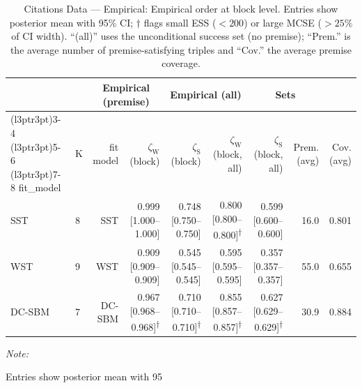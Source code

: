 \begin{table}
\centering
\caption{\label{tab:tab:citations-data-empirical-emp-block}Citations Data — Empirical: Empirical order at block level. Entries show posterior mean with 95\% CI; $\dagger$ flags small ESS ($<200$) or large MCSE ($>25\%$ of CI width). “(all)” uses the unconditional success set (no premise); “Prem.” is the average number of premise-satisfying triples and “Cov.” the average premise coverage.}
\centering
\begin{threeparttable}
\begin{tabular}[t]{llrrrrrrr}
\toprule
\multicolumn{2}{c}{ } & \multicolumn{2}{c}{Empirical (premise)} & \multicolumn{2}{c}{Empirical (all)} & \multicolumn{2}{c}{Sets} \\
\cmidrule(l{3pt}r{3pt}){3-4} \cmidrule(l{3pt}r{3pt}){5-6} \cmidrule(l{3pt}r{3pt}){7-8}
fit_model & K & fit model & $\zeta_{\mathrm{W}}$ (block) & $\zeta_{\mathrm{S}}$ (block) & $\zeta_{\mathrm{W}}$ (block, all) & $\zeta_{\mathrm{S}}$ (block, all) & Prem. (avg) & Cov. (avg)\\
\midrule
SST & 8 & SST & 0.999 [1.000--1.000] & 0.748 [0.750--0.750] & 0.800 [0.800--0.800]\textsuperscript{$\dagger$} & 0.599 [0.600--0.600] & 16.0 & 0.801\\
WST & 9 & WST & 0.909 [0.909--0.909] & 0.545 [0.545--0.545] & 0.595 [0.595--0.595] & 0.357 [0.357--0.357] & 55.0 & 0.655\\
DC-SBM & 7 & DC-SBM & 0.967 [0.968--0.968]\textsuperscript{$\dagger$} & 0.710 [0.710--0.710]\textsuperscript{$\dagger$} & 0.855 [0.857--0.857]\textsuperscript{$\dagger$} & 0.627 [0.629--0.629]\textsuperscript{$\dagger$} & 30.9 & 0.884\\
\bottomrule
\end{tabular}
\begin{tablenotes}
\item \textit{Note: } 
\item Entries show posterior mean with 95%
\end{tablenotes}
\end{threeparttable}
\end{table}